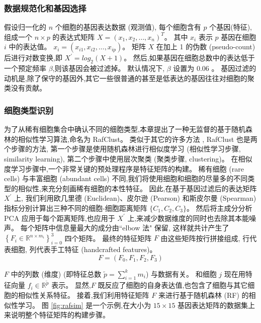 \subsubsection{数据规范化和基因选择}
\label{subsec:datapreprocessing} 

假设归一化的 $n$ 个细胞的基因表达数据 (观测值), 每个细胞含有 $p$ 个基因(特征),
组成一个 $n \times p$ 的表达式矩阵 $X=\left(x_{1}, x_{2}, \ldots, x_{n} \right)^ T$。
其中 $x_{i}$ 表示 $p$ 基因在细胞 $i$ 中的表达值。
$x_{i}=\left(x_{i1}, x_{i2},\ldots, x_{ip} \right)$。
矩阵 $X$ 在加上 1 的伪数 (pseudo-count) 后进行对数变换,即 $X^{\prime} = log_2 (X + 1)$。
然后,如果基因在细胞总数中的表达低于一个预定频率 $\beta$,则该基因会被过滤掉。
默认情况下, $\beta$ 设置为 0.06 。 
基因过滤的动机是,除了保守的基因外,其它一些很普通的甚至是低表达的基因往往对细胞的聚类没有贡献。

\subsubsection{细胞类型识别}
\label{subsec:rafclust} 
为了从稀有细胞集合中确认不同的细胞类型,本章提出了一种无监督的基于随机森林的相似性学习算法,命名为 RafClust。
类似于其它的许多方法 ,
RafClust 也是两个步骤的方法,
第一个步骤是使用随机森林进行相似度学习 (相似性学习步骤, similarity learning),
第二个步骤中使用层次聚类 (聚类步骤, clustering)。
在相似度学习步骤中,一个非常关键的预处理程序是特征矩阵的构建。
稀有细胞 (rare cells) 与丰富细胞 (abundant cells) 不同,我们将使用细胞和细胞的尽量多的不同类型的相似性,来充分刻画稀有细胞的本性特征。
因此,在基于基因过滤后的表达矩阵 $X^{\prime}$ 上,
我们利用欧几里德 (Euclidean)、皮尔逊 (Pearson) 和斯皮尔曼 (Spearman) 指标分别计算出三种不同的细胞-细胞距离矩阵 $\{C_1, C_2, C_3\}$。
然后将主成分分析 PCA 应用于每个距离矩阵,也应用于 $X^{\prime}$ 上,来减少数据维度的同时也去除其本能噪声。
每个矩阵中信息量最大的成分由``elbow 法"  保留,
这样就共计产生了 $\left\{ {F}_{i} \in \mathbb {R} ^ {n \times m_{i}} \right\}_{i = 0}^{3}$ 四个矩阵。
最终的特征矩阵 $F$ 由这些矩阵按行拼接组成, 行代表细胞, 列代表手工特征 (handcrafted features)。
\begin{equation}
\label{lab:f}
{F} = ({F}_{0}, {F}_{1}, {F}_{2}, {F}_{3})
\end{equation}

$F$ 中的列数 (维度) (即特征总数 $\tilde {p} = \sum_{i = 1}^{k} m_{i}$) 与数据有关。
和细胞 $j$ 现在用特征向量 $f_{i} \in \mathbb {R} ^ {\tilde{p}}$ 表示。
显然,$F$ 既反应了细胞的自身表达值,也包含了细胞与其它细胞的相似性关系特征。
接着,我们利用特征矩阵 $F$ 来进行基于随机森林 (RF) 的相似性学习。
图 \ref{fig:rafsim} 是一个示例,在大小为 $15 \times 15$ 基因表达矩阵的数据集上来说明整个特征矩阵的构建步骤。

